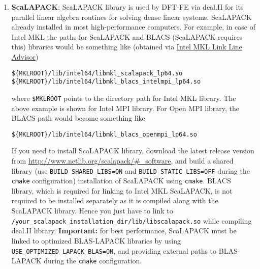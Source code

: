 \begin{enumerate}
\item {\bf ScaLAPACK}: ScaLAPACK library is used by DFT-FE via deal.II for its parallel linear algebra routines for solving dense linear systems. ScaLAPACK already installed in most high-performance computers. For example, in case of Intel MKL the paths for ScaLAPACK and BLACS (ScaLAPACK requires this) libraries would be something like (obtained via \href{https://software.intel.com/en-us/articles/intel-mkl-link-line-advisor}{Intel MKL Link Line Advisor})
\begin{verbatim}
${MKLROOT}/lib/intel64/libmkl_scalapack_lp64.so
${MKLROOT}/lib/intel64/libmkl_blacs_intelmpi_lp64.so
\end{verbatim}
where \verb|$MKLROOT| points to the directory path for Intel MKL library. The above example is shown for Intel MPI library. For Open MPI library, the BLACS path would become something like
\begin{verbatim}
${MKLROOT}/lib/intel64/libmkl_blacs_openmpi_lp64.so
\end{verbatim}

If you need to install ScaLAPACK library, download the latest release version from \url{http://www.netlib.org/scalapack/#\_software}, and build a shared library (use \verb|BUILD_SHARED_LIBS=ON| and \verb|BUILD_STATIC_LIBS=OFF|  during the \verb|cmake| configuration) installation of ScaLAPACK using \verb|cmake|. BLACS library, which is required for linking to Intel MKL ScaLAPACK, is not required to be installed separately as it is compiled along with the ScaLAPACK library. Hence you just have to link to \verb|/your_scalapack_installation_dir/lib/libscalapack.so| while compiling deal.II library. {\bf Important: } for best performance, ScaLAPACK must be linked to optimized BLAS-LAPACK libraries by using \verb|USE_OPTIMIZED_LAPACK_BLAS=ON|, and providing external paths to BLAS-LAPACK during the \verb|cmake| configuration.   	
\end{enumerate}

